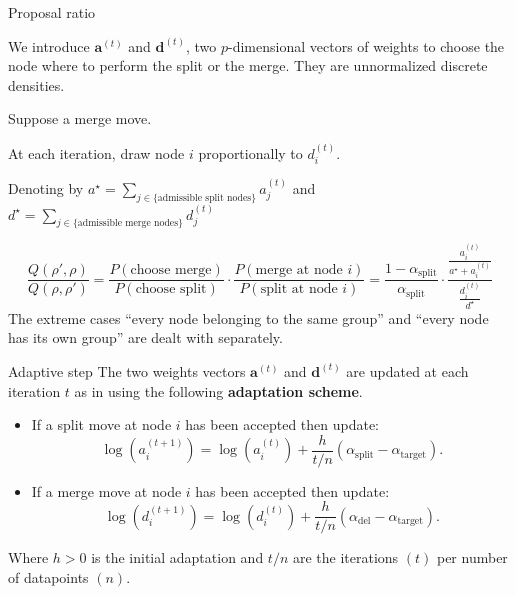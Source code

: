 \begin{frame}{Proposal ratio}

We introduce $\bm{a}^{(t)}$ and $\bm{d}^{(t)}$, two $p$-dimensional vectors of \alert{weights} to choose the node where to perform the split or the merge. They are unnormalized discrete densities.

\pause

Suppose a merge move.

\pause

At each iteration, \alert{draw} node $i$ proportionally to $d_{i}^{(t)}$.

\pause

Denoting by $a^{\star} = \sum_{j\in \{\text{admissible split nodes}\}}{a_{j}^{(t)}}$ and $d^{\star} = \sum_{j\in \{\text{admissible merge nodes}\}}{d_{j}^{(t)}}$

\pause

\[
    \frac{Q(\rho',\rho)}{Q(\rho,\rho')}
    =
    \frac{P(\text{choose merge})}{P(\text{choose split})}
    \cdot 
    \frac{P(\text{merge at node $i$})}{P(\text{split at node $i$})}
    =
    \frac{1-\alpha_{\text{split}}}{\alpha_{\text{split}}}
    \cdot
    \frac{\frac{a_{i}^{(t)}}{a^{\star}+a_{i}^{(t)}}}{\frac{d_{i}^{(t)}}{d^{\star}}}
\]
The extreme cases ``every node belonging to the same group'' and ``every node has its own group'' are dealt with separately.

\end{frame}




\begin{frame}{Adaptive step}
    The two weights vectors $\bm{a}^{(t)}$ and $\bm{d}^{(t)}$ are updated at each iteration $t$ as in \cite{bensonAdaptiveMCMCMultiple2018} using the following 
    \textbf{adaptation scheme}.

    \begin{itemize}
        \item If a \alert{split} move at node $i$ has been accepted then update:
		\[
		\log (a_i^{(t+1)})=\log (a_i^{(t)})+\frac{h}{t / n}(\alpha_{\text{split}}-\alpha_{\text{target}}) .
		\]
        \item If a \alert{merge} move at node $i$ has been accepted then update:
		\[
		\log (d_i^{(t+1)})=\log (d_i^{(t)})+\frac{h}{t / n}(\alpha_{\text{del}}-\alpha_{\text{target}}) .
		\]
        \end{itemize}
Where $h>0$ is the initial adaptation and $t/n$ are the iterations $(t)$ per number of datapoints $(n)$.

\end{frame}



